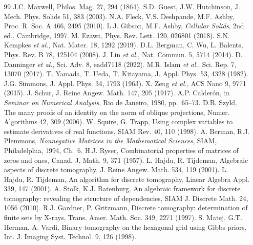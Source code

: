 \documentclass[11pt,a4paper]{article}
\theoremstyle{definition}
\theoremstyle{remark}
\begin{document}
\begin{thebibliography}{99}\small
{} J.C. Maxwell, Philos. Mag. 27, 294 (1864).
 S.D. Guest, J.W. Hutchinson, J. Mech. Phys. Solids 51, 383 (2003).
 N.A. Fleck, V.S. Deshpande, M.F. Ashby, Proc. R. Soc. A 466, 2495 (2010).
 L.J. Gibson, M.F. Ashby, \textit{Cellular Solids}, 2nd ed., Cambridge, 1997.
 M. Ezawa, Phys. Rev. Lett. 120, 026801 (2018).
 S.N. Kempkes \textit{et al.}, Nat. Mater. 18, 1292 (2019).
 D.L. Bergman, C. Wu, L. Balents, Phys. Rev. B 78, 125104 (2008).
 J. Lin \textit{et al.}, Nat. Commun. 5, 5714 (2014).
 D. Danninger \textit{et al.}, Sci. Adv. 8, eadd7118 (2022).
 M.R. Islam \textit{et al.}, Sci. Rep. 7, 13070 (2017).
 T. Yamada, T. Ueda, T. Kitayama, J. Appl. Phys. 53, 4328 (1982).
 J.G. Simmons, J. Appl. Phys. 34, 1793 (1963).
 X. Zeng \textit{et al.}, ACS Nano 9, 9771 (2015).
 J. Schur, J. Reine Angew. Math. 147, 205 (1917).
 A.P. Calder\'on, in \textit{Seminar on Numerical Analysis}, Rio de Janeiro, 1980, pp.~65--73.
 D.B. Szyld, The many proofs of an identity on the norm of oblique projections, Numer. Algorithms 42, 309 (2006).
 W. Squire, G. Trapp, Using complex variables to estimate derivatives of real functions, SIAM Rev. 40, 110 (1998).
 A. Berman, R.J. Plemmons, \textit{Nonnegative Matrices in the Mathematical Sciences}, SIAM, Philadelphia, 1994, Ch.~6.
 H.J. Ryser, Combinatorial properties of matrices of zeros and ones, Canad. J. Math. 9, 371 (1957).
 L. Hajdu, R. Tijdeman, Algebraic aspects of discrete tomography, J. Reine Angew. Math. 534, 119 (2001).
 L. Hajdu, R. Tijdeman, An algorithm for discrete tomography, Linear Algebra Appl. 339, 147 (2001).
 A. Stolk, K.J. Batenburg, An algebraic framework for discrete tomography: revealing the structure of dependencies, SIAM J. Discrete Math. 24, 1056 (2010).
 R.J. Gardner, P. Gritzmann, Discrete tomography: determination of finite sets by X-rays, Trans. Amer. Math. Soc. 349, 2271 (1997).
 S. Matej, G.T. Herman, A. Vardi, Binary tomography on the hexagonal grid using Gibbs priors, Int. J. Imaging Syst. Technol. 9, 126 (1998).

\end{thebibliography}
\end{document}
